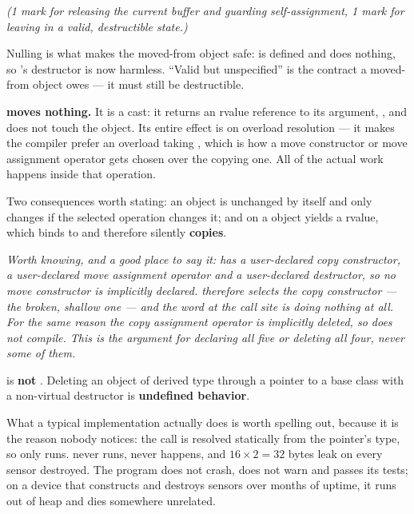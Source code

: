\noindent\textit{(1 mark for releasing the current buffer and guarding self-assignment, 1 mark for
leaving  in a valid, destructible state.)}

Nulling  is what makes the moved-from object safe:  is
defined and does nothing, so 's destructor is now harmless. ``Valid but unspecified'' is
the contract a moved-from object owes --- it must still be destructible.

\textbf{ moves nothing.} It is a cast: it returns an rvalue reference to its
argument, , and does not touch the object. Its entire effect is on overload
resolution --- it makes the compiler prefer an overload taking , which is how a move
constructor or move assignment operator gets chosen over the copying one. All of the actual work
happens inside that operation. 

Two consequences worth stating: an object is unchanged by  itself and only changes
if the selected operation changes it; and  on a  object yields a
 rvalue, which binds to  and therefore silently \textbf{copies}.

\textit{Worth knowing, and a good place to say it:  has a user-declared copy
constructor, a user-declared move assignment operator and a user-declared destructor, so no move
constructor is implicitly declared.  therefore selects the copy
constructor --- the broken, shallow one --- and the word  at the call site is doing
nothing at all. For the same reason the copy assignment operator is implicitly deleted, so
 does not compile. This is the argument for declaring all five or deleting all four,
never some of them.}


 is \textbf{not} . Deleting an object of derived type through a
pointer to a base class with a non-virtual destructor is \textbf{undefined behavior}. 

What a typical implementation actually does is worth spelling out, because it is the reason nobody
notices: the call is resolved statically from the pointer's type, so only  runs.
 never runs,  never happens, and $16 \times 2 = 32$ bytes
leak on every sensor destroyed. The program does not crash, does not warn and passes its tests; on a
device that constructs and destroys sensors over months of uptime, it runs out of heap and dies
somewhere unrelated. 

